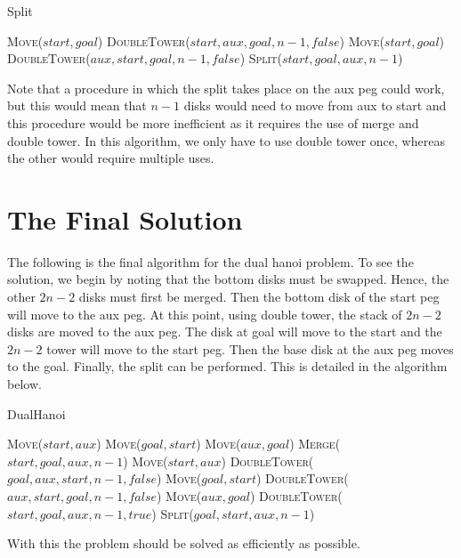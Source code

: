 \documentclass[fontsize = 10pt]{scrartcl}
\begin{document}
\begin{algorithm}[H]
\caption{Split}
\begin{algorithmic}[1]
\State \textsc{Move}($start, goal$)
\Else
\State \textsc{DoubleTower}($start, aux, goal, n-1, false$)
\State \textsc{Move}($start, goal$)
\State \textsc{DoubleTower}($aux, start, goal, n-1, false$)
\State \textsc{Split}($start, goal, aux, n-1$)
\EndIf
\EndProcedure
\end{algorithmic}
\end{algorithm}
Note that a procedure in which the split takes place on the aux peg could work, but this would mean that $n-1$ disks would need to move from aux to start and this procedure would be more inefficient as it requires the use of merge and double tower. In this algorithm, we only have to use double tower once, whereas the other would require multiple uses.

\section{The Final Solution}
The following is the final algorithm for the dual hanoi problem. To see the solution, we begin by noting that the bottom disks must be swapped. Hence, the other $2n - 2$ disks must first be merged. Then the bottom disk of the start peg will move to the aux peg. At this point, using double tower, the stack of $2n-2$ disks are moved to the aux peg. The disk at goal will move to the start and the $2n-2$ tower will move to the start peg. Then the base disk at the aux peg moves to the goal. Finally, the split can be performed. This is detailed in the algorithm below.
\begin{algorithm}[H]
\caption{DualHanoi}
\begin{algorithmic}[1]
\State \textsc{Move}($start, aux$)
\State \textsc{Move}($goal, start$)
\State \textsc{Move}($aux, goal$)
\Else
\State \textsc{Merge}($start, goal, aux, n-1$)
\State \textsc{Move}($start, aux$)
\State \textsc{DoubleTower}($goal, aux, start, n-1, false$) 
\State \textsc{Move}($goal, start$)
\State \textsc{DoubleTower}($aux, start, goal, n-1, false$) 
\State \textsc{Move}($aux, goal$)
\State \textsc{DoubleTower}($start, goal, aux, n-1, true$) 
\State \textsc{Split}($goal, start, aux, n-1$)
\EndIf
\EndProcedure
\end{algorithmic}
\end{algorithm}
With this the problem should be solved as efficiently as possible. 
\end{document}

